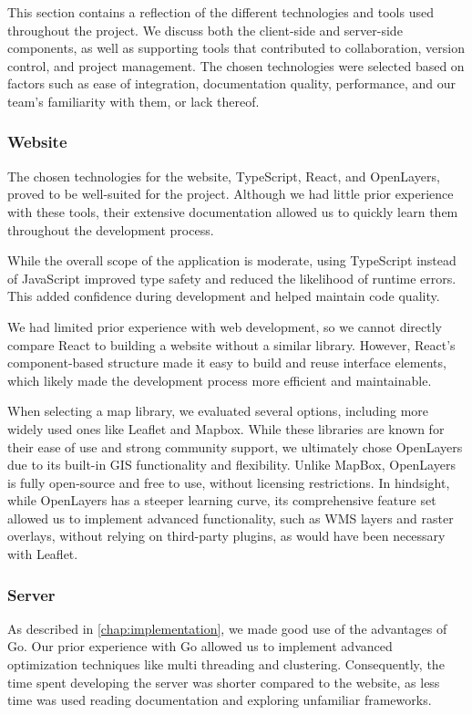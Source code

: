 This section contains a reflection of the different technologies and tools used throughout the project. We discuss both the client-side and server-side components, as well as supporting tools that contributed to collaboration, version control, and project management. The chosen technologies were selected based on factors such as ease of integration, documentation quality, performance, and our team's familiarity with them, or lack thereof.

\subsubsection{Website}

The chosen technologies for the website, TypeScript, React, and OpenLayers, proved to be well-suited for the project. Although we had little prior experience with these tools, their extensive documentation allowed us to quickly learn them throughout the development process.

While the overall scope of the application is moderate, using TypeScript instead of JavaScript improved type safety and reduced the likelihood of runtime errors. This added confidence during development and helped maintain code quality.

We had limited prior experience with web development, so we cannot directly compare React to building a website without a similar library. However, React's component-based structure made it easy to build and reuse interface elements, which likely made the development process more efficient and maintainable.

When selecting a map library, we evaluated several options, including more widely used ones like Leaflet and Mapbox. While these libraries are known for their ease of use and strong community support, we ultimately chose OpenLayers due to its built-in GIS functionality and flexibility. Unlike MapBox, OpenLayers is fully open-source and free to use, without licensing restrictions. In hindsight, while OpenLayers has a steeper learning curve, its comprehensive feature set allowed us to implement advanced functionality, such as WMS layers and raster overlays, without relying on third-party plugins, as would have been necessary with Leaflet.

\subsubsection{Server}

As described in \autoref{chap:implementation}, we made good use of the advantages of Go. Our prior experience with Go allowed us to implement advanced optimization techniques like multi threading and clustering. Consequently, the time spent developing the server was shorter compared to the website, as less time was used reading documentation and exploring unfamiliar frameworks.

